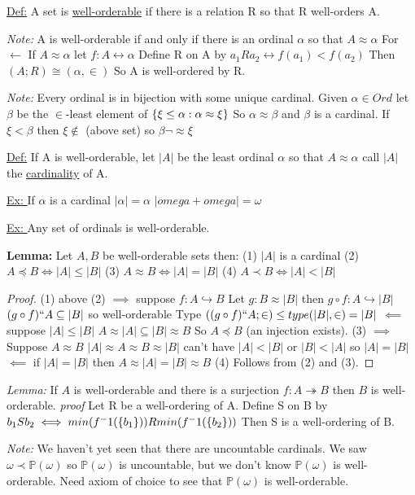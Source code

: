 \underline{Def:} A set is \underline{well-orderable} if there is a relation R so that R well-orders A.

\emph{Note:} A is well-orderable if and only if there is an ordinal $\alpha$ so that $A \approx \alpha$
For $\leftarrow$ If $A \approx \alpha$ let $f : A \leftrightarrow \alpha$
Define R on A by $a_1 R a_2 \leftrightarrow f(a_1) < f(a_2)$
Then $(A;R) \cong (\alpha, \in)$
So A is well-ordered by R.

\emph{Note:} Every ordinal is in bijection with some unique cardinal.
Given $\alpha \in Ord$ let $\beta$ be the $\in$-least element of
$\{\xi \leq \alpha : \alpha \approx \xi\}$
So $\alpha \approx \beta$ and $\beta$ is a cardinal.
If $\xi < \beta$ then $\xi \notin$ (above set) so $\beta \neg \approx \xi$

\underline{Def:} If A is well-orderable, let $|A|$ be the least ordinal $\alpha$ so that $A \approx \alpha$ call $|A|$ the \underline{cardinality} of A.

\underline{Ex: } If $\alpha$ is a cardinal $|\alpha| = \alpha$
$|omega + omega| = \omega$

\underline{Ex: } Any set of ordinals is well-orderable.

\textbf{Lemma: } Let $A,B$ be well-orderable sets then:
(1) $|A|$ is a cardinal
(2) $A \preceq B \iff |A| \leq |B|$
(3) $A \approx B \iff |A| = |B|$
(4) $A \prec B \iff |A| < |B|$

\begin{proof}
(1) above
(2) $\implies$ suppose $f : A \hookrightarrow B$
    Let $g : B \approx |B|$
    then $g \circ f : A \hookrightarrow |B|$
    $(g \circ f)`` A \subseteq |B|$
    so well-orderable
    Type $((g \circ f)``A;\in) \leq type(|B|,\in) = |B|$
    $\impliedby$ suppose $|A| \leq |B|$
    $A \approx |A| \subseteq |B| \approx B$
    So $A \preceq B$ (an injection exists).
(3) $\implies$ Suppose $A \approx B$
    $|A| \approx A \approx B \approx |B|$
    can't have $|A| < |B|$ or $|B| < |A|$
    so $|A| = |B|$
    $\impliedby$ if $|A| = |B|$ then $A \approx |A| = |B| \approx B$
(4) Follows from (2) and (3).
\end{proof}

\emph{Lemma:} If $A$ is well-orderable and there is a surjection $f: A \twoheadrightarrow B$ then $B$ is well-orderable.
\emph{proof} Let R be a well-ordering of A.
Define S on B by $b_1 S b_2 \iff min(f^-1(\{b_1\})) R min(f^-1(\{b_2\}))$
Then S is a well-ordering of B.

\emph{Note:} We haven't yet seen that there are uncountable cardinals.
We saw $\omega \prec \mathbb{P}(\omega)$ so $\mathbb{P}(\omega)$ is uncountable, but we don't know $\mathbb{P}(\omega)$ is well-orderable.
Need axiom of choice to see that $\mathbb{P}(\omega)$ is well-orderable.

